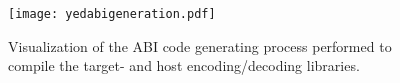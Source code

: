 
\begin{figure}
\centering

\texttt{[image: yedabigeneration.pdf]}

\caption[The ABI code generation process]{Visualization of the ABI code generating process performed to compile the target- and host encoding/decoding libraries.}
\label{fig:virtualmemory}

\end{figure}